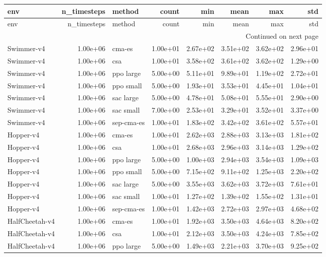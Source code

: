 \begin{longtable}{lrlrrrrr}
\toprule
env & n_timesteps & method & count & min & mean & max & std \\
\midrule
\endfirsthead
\toprule
env & n_timesteps & method & count & min & mean & max & std \\
\midrule
\endhead
\midrule
\multicolumn{8}{r}{Continued on next page} \\
\midrule
\endfoot
\bottomrule
\endlastfoot
Swimmer-v4 & 1.00e+06 & cma-es & 1.00e+01 & 2.67e+02 & 3.51e+02 & 3.62e+02 & 2.96e+01 \\
Swimmer-v4 & 1.00e+06 & csa & 1.00e+01 & 3.58e+02 & 3.61e+02 & 3.62e+02 & 1.29e+00 \\
Swimmer-v4 & 1.00e+06 & ppo large & 5.00e+00 & 5.11e+01 & 9.89e+01 & 1.19e+02 & 2.72e+01 \\
Swimmer-v4 & 1.00e+06 & ppo small & 5.00e+00 & 1.93e+01 & 3.53e+01 & 4.45e+01 & 1.04e+01 \\
Swimmer-v4 & 1.00e+06 & sac large & 5.00e+00 & 4.78e+01 & 5.08e+01 & 5.55e+01 & 2.90e+00 \\
Swimmer-v4 & 1.00e+06 & sac small & 7.00e+00 & 2.53e+01 & 3.29e+01 & 3.52e+01 & 3.37e+00 \\
Swimmer-v4 & 1.00e+06 & sep-cma-es & 1.00e+01 & 1.83e+02 & 3.42e+02 & 3.61e+02 & 5.57e+01 \\
Hopper-v4 & 1.00e+06 & cma-es & 1.00e+01 & 2.62e+03 & 2.88e+03 & 3.13e+03 & 1.81e+02 \\
Hopper-v4 & 1.00e+06 & csa & 1.00e+01 & 2.68e+03 & 2.96e+03 & 3.14e+03 & 1.29e+02 \\
Hopper-v4 & 1.00e+06 & ppo large & 5.00e+00 & 1.00e+03 & 2.94e+03 & 3.54e+03 & 1.09e+03 \\
Hopper-v4 & 1.00e+06 & ppo small & 5.00e+00 & 7.15e+02 & 9.11e+02 & 1.25e+03 & 2.20e+02 \\
Hopper-v4 & 1.00e+06 & sac large & 5.00e+00 & 3.55e+03 & 3.62e+03 & 3.72e+03 & 7.61e+01 \\
Hopper-v4 & 1.00e+06 & sac small & 1.00e+01 & 1.27e+02 & 1.39e+02 & 1.55e+02 & 1.31e+01 \\
Hopper-v4 & 1.00e+06 & sep-cma-es & 1.00e+01 & 1.42e+03 & 2.72e+03 & 2.97e+03 & 4.68e+02 \\
HalfCheetah-v4 & 1.00e+06 & cma-es & 1.00e+01 & 1.92e+03 & 3.50e+03 & 4.64e+03 & 8.20e+02 \\
HalfCheetah-v4 & 1.00e+06 & csa & 1.00e+01 & 2.12e+03 & 3.50e+03 & 4.24e+03 & 7.85e+02 \\
HalfCheetah-v4 & 1.00e+06 & ppo large & 5.00e+00 & 1.49e+03 & 2.21e+03 & 3.70e+03 & 9.25e+02 \\

\end{longtable}
